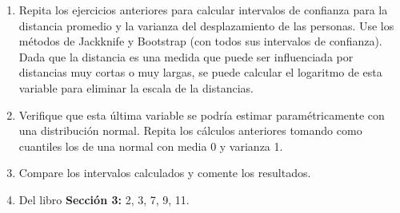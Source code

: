 \documentclass[
  12pt,
]{book}
\theoremstyle{definition}
\theoremstyle{definition}
\theoremstyle{definition}
\theoremstyle{definition}
\theoremstyle{remark}
\begin{document}
\begin{enumerate}
\def\labelenumi{\arabic{enumi}.}
\item
  Repita los ejercicios anteriores para calcular intervalos de confianza para la distancia promedio y la varianza del desplazamiento de las personas. Use los métodos de Jackknife y Bootstrap (con todos sus intervalos de confianza).
  Dada que la distancia es una medida que puede ser influenciada por distancias muy cortas o muy largas, se puede calcular el logaritmo de esta variable para eliminar la escala de la distancias.
\item
  Verifique que esta última variable se podría estimar paramétricamente con una distribución normal.
  Repita los cálculos anteriores tomando como cuantiles los de una normal con media 0 y varianza 1.
\item
  Compare los intervalos calculados y comente los resultados.
\item
  Del libro \autocite{Wasserman2006} \textbf{Sección 3:} 2, 3, 7, 9, 11.
\end{enumerate}

\printbibliography
\end{document}
